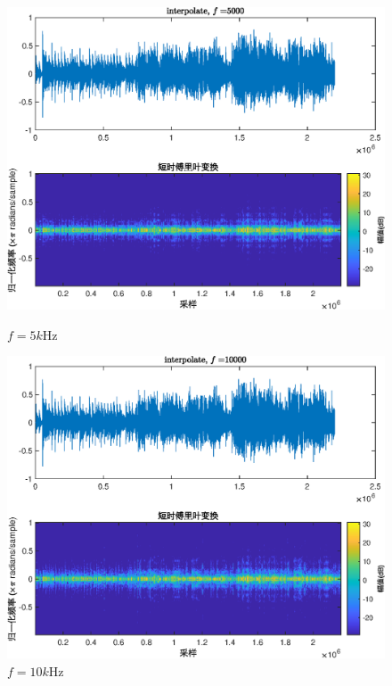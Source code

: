 \documentclass[fontset=macnew]{article}
\begin{document}
\begin{figure}[htbp]
	\begin{minipage}[b]{0.32\linewidth}
		\includegraphics[width=\linewidth]{interpolate_5000.eps}
		\caption*{$f=5k$Hz}
		\label{int5}
	\end{minipage}
	\begin{minipage}[b]{0.32\linewidth}
		\includegraphics[width=\linewidth]{interpolate_10000.eps}
		\caption*{$f=10k$Hz}
		\label{int10}
	\end{minipage}
	\begin{minipage}[b]{0.32\linewidth}

\end{minipage}
\end{figure}
\end{document}
